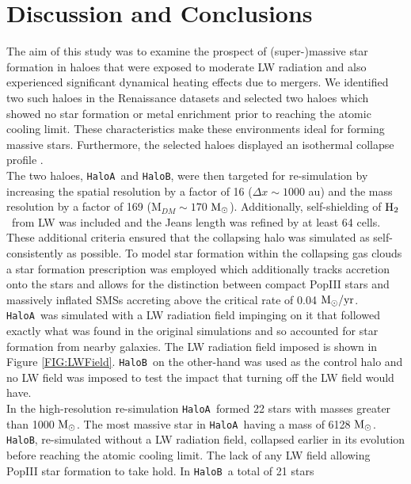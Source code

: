 \documentclass[graphics, twocolumn, usenatbib]{mn2e}
\newcommand{\msolarc} {$\rm{M_{\odot}}$}
\newcommand{\msolaryrc} {$\rm{M_{\odot}/yr}$}
\newcommand{\molH} {$\rm{H_2}$~}
\newcommand{\ha} {\texttt{HaloA~}}
\newcommand{\hb} {\texttt{HaloB~}}
\newcommand{\hbc} {\texttt{HaloB}}
\begin{document}



\section{Discussion and Conclusions} \label{Sec:Discussion}
The aim of this study was to examine the prospect of (super-)massive star formation in haloes
that were exposed to moderate LW radiation and also experienced significant dynamical heating
effects due to mergers. We identified two such haloes in the Renaissance datasets \citep{Regan_2019}
and selected two haloes which showed no star formation or metal enrichment prior to reaching the
atomic cooling limit. These characteristics make these environments ideal for forming massive
stars. Furthermore, the selected haloes displayed an isothermal collapse profile \citep{Regan_2019}.\\
\indent The two haloes, \ha and \hbc, were then targeted for re-simulation by increasing the
spatial resolution by a factor of 16 ($\Delta x \sim 1000$ au) and the mass resolution by a factor of
169 (M$_{DM} \sim 170$ \msolarc). Additionally, self-shielding of \molH from LW was included and
the Jeans length was refined by at least 64 cells. These additional criteria ensured that the
collapsing halo was simulated as self-consistently as possible. To model star formation within
the collapsing gas clouds a star formation prescription was employed which additionally tracks accretion
onto the stars and allows for the distinction between compact PopIII stars and massively inflated
SMSs accreting above the critical rate of 0.04 \msolaryrc. \\
\indent \ha was simulated with a LW radiation field impinging on it that followed exactly what was
found in the original simulations and so accounted for star formation from nearby galaxies. The
LW radiation field imposed is shown in Figure \ref{FIG:LWField}. \hb on the other-hand was used as the
control halo and no LW field was imposed to test the impact that turning off the LW field would have.\\
\indent In the high-resolution re-simulation \ha formed 22 stars with masses greater than 1000
\msolarc. The most massive star in \ha having a mass of 6128 \msolarc. \hbc, re-simulated without
a LW radiation field, collapsed earlier in its evolution before reaching the atomic cooling limit.
The lack of any LW field allowing PopIII star formation to take hold. In \hb a total of 21 stars
\end{document}
